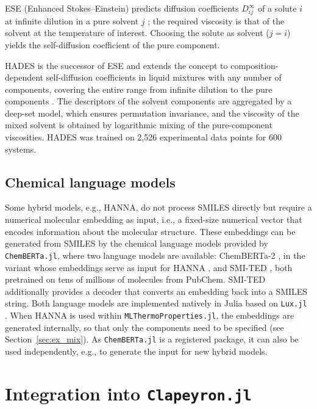 \documentclass{juliacon}
\begin{document}
ESE (Enhanced Stokes--Einstein) predicts diffusion coefficients $D_{ij}^\infty$ of a solute $i$ at infinite dilution in a pure solvent $j$ \cite{wagner_hybrid_2026-1}; the required viscosity is that of the solvent at the temperature of interest.
Choosing the solute as solvent ($j=i$) yields the self-diffusion coefficient of the pure component.

HADES is the successor of ESE and extends the concept to composition-dependent self-diffusion coefficients in liquid mixtures with any number of components, covering the entire range from infinite dilution to the pure components \cite{wagner_composition-dependent_2026}.
The descriptors of the solvent components are aggregated by a deep-set model, which ensures permutation invariance, and the viscosity of the mixed solvent is obtained by logarithmic mixing of the pure-component viscosities.
HADES was trained on 2,526 experimental data points for 600 systems.

\subsection{Chemical language models} \label{sec:language}

Some hybrid models, e.g., HANNA, do not process SMILES directly but require a numerical molecular embedding as input, i.e., a fixed-size numerical vector that encodes information about the molecular structure.
These embeddings can be generated from SMILES by the chemical language models provided by \texttt{ChemBERTa.jl}, where two language models are available: ChemBERTa-2 \cite{ahmad_chemberta-2_2022}, in the variant whose embeddings serve as input for HANNA \cite{specht_hanna_2024-1}, and SMI-TED \cite{soares_open-source_2025}, both pretrained on tens of millions of molecules from PubChem.
SMI-TED additionally provides a decoder that converts an embedding back into a SMILES string.
Both language models are implemented natively in Julia based on \texttt{Lux.jl} \cite{pal_lux_2026}.
When HANNA is used within \texttt{MLThermoProperties.jl}, the embeddings are generated internally, so that only the components need to be specified (see Section~\ref{sec:ex_mix}).
As \texttt{ChemBERTa.jl} is a registered package, it can also be used independently, e.g., to generate the input for new hybrid models.

\section{Integration into \texttt{Clapeyron.jl}} \label{sec:integration}
\end{document}
